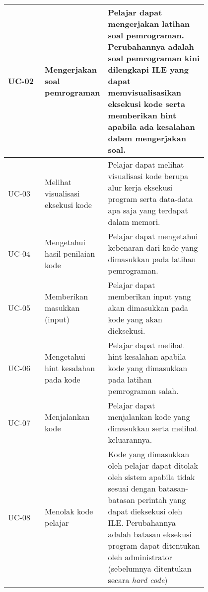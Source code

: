 \begin{longtable}[c]{|l|>{\setlength{\baselineskip}{0.75\baselineskip}}p{0.3\linewidth}|>{\setlength{\baselineskip}{0.75\baselineskip}}p{0.5\linewidth}|}
  UC-02       & Mengerjakan soal pemrograman                   & Pelajar dapat mengerjakan latihan soal pemrograman. Perubahannya adalah soal pemrograman kini dilengkapi ILE yang dapat memvisualisasikan eksekusi kode serta memberikan hint apabila ada kesalahan dalam mengerjakan soal.                                                         \\ \hline
  UC-03       & Melihat visualisasi eksekusi kode              & Pelajar dapat melihat visualisasi kode berupa alur kerja eksekusi program serta data-data apa saja yang terdapat dalam memori.                                                                                                                                                      \\ \hline
  UC-04       & Mengetahui hasil penilaian kode                & Pelajar dapat mengetahui kebenaran dari kode yang dimasukkan pada latihan pemrograman.                                                                                                                                                                                              \\ \hline
  UC-05       & Memberikan masukkan (input)                    & Pelajar dapat memberikan input yang akan dimasukkan pada kode yang akan dieksekusi.                                                                                                                                                                                                 \\ \hline
  UC-06       & Mengetahui hint kesalahan pada kode            & Pelajar dapat melihat hint kesalahan apabila kode yang dimasukkan pada latihan pemrograman salah.                                                                                                                                                                                   \\ \hline
  UC-07       & Menjalankan kode                               & Pelajar dapat menjalankan kode yang dimasukkan serta melihat keluarannya.                                                                                                                                                                                                           \\ \hline
  UC-08       & Menolak kode pelajar                           & Kode yang dimasukkan oleh pelajar dapat ditolak oleh sistem apabila tidak sesuai dengan batasan-batasan perintah yang dapat dieksekusi oleh ILE. Perubahannya adalah batasan eksekusi program dapat ditentukan oleh administrator (sebelumnya ditentukan secara \textit{hard code}) \\ \hline

\end{longtable}

